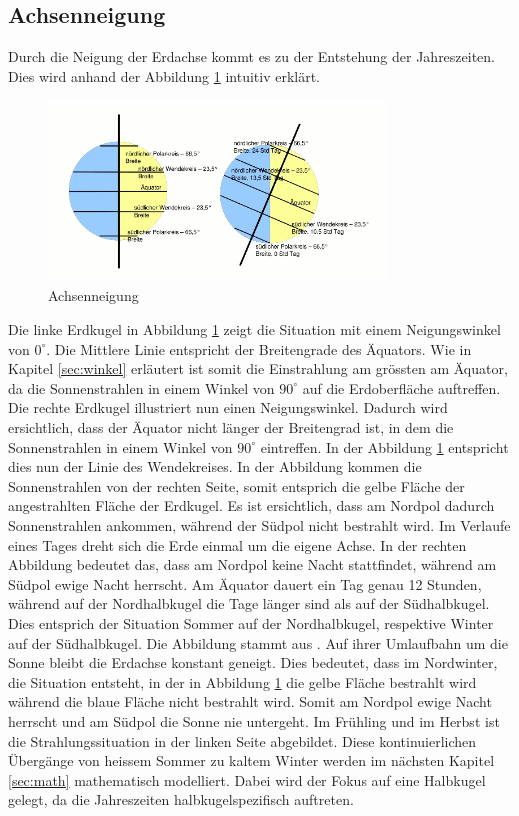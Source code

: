 \begin{refsection}
\section{Achsenneigung}\label{sec:neigung} 
Durch die Neigung der Erdachse kommt es zu der Entstehung der Jahreszeiten. Dies wird anhand der Abbildung \ref{fig:abb6} intuitiv erklärt. 
%
\begin{figure}
	\centering
	\includegraphics[width= 0.8\textwidth]{neigung/tagundnacht.png}
	\caption[Achsenneigung]{Achsenneigung}
	\label{fig:abb6}
\end{figure}
%
Die linke Erdkugel in Abbildung \ref{fig:abb6} zeigt die Situation mit einem Neigungswinkel von $0^\circ$. Die Mittlere Linie entspricht der Breitengrade des Äquators. Wie in Kapitel \ref{sec:winkel} erläutert ist somit die Einstrahlung am grössten am Äquator, da die Sonnenstrahlen in einem Winkel von $90^\circ$ auf die Erdoberfläche auftreffen. Die rechte Erdkugel illustriert nun einen Neigungswinkel. Dadurch wird ersichtlich, dass der Äquator nicht länger der Breitengrad ist, in dem die Sonnenstrahlen in einem Winkel von $90^\circ$ eintreffen. In der Abbildung \ref{fig:abb6} entspricht dies nun der Linie des Wendekreises. In der Abbildung kommen die Sonnenstrahlen von der rechten Seite, somit entsprich die gelbe Fläche der angestrahlten Fläche der Erdkugel. Es ist ersichtlich, dass am Nordpol dadurch Sonnenstrahlen ankommen, während der Südpol nicht bestrahlt wird. Im Verlaufe eines Tages dreht sich die Erde einmal um die eigene Achse. In der rechten Abbildung bedeutet das, dass am Nordpol keine Nacht stattfindet, während am Südpol ewige Nacht herrscht. Am Äquator dauert ein Tag genau 12 Stunden, während auf der Nordhalbkugel die Tage länger sind als auf der Südhalbkugel. Dies entsprich der Situation Sommer auf der Nordhalbkugel, respektive Winter auf der Südhalbkugel. Die Abbildung stammt aus \cite{fa}.
Auf ihrer Umlaufbahn um die Sonne bleibt die Erdachse konstant geneigt. Dies bedeutet, dass im Nordwinter, die Situation entsteht, in der in Abbildung \ref{fig:abb6} die gelbe Fläche bestrahlt wird während die blaue Fläche nicht bestrahlt wird. Somit am Nordpol ewige Nacht herrscht und am Südpol die Sonne nie untergeht. Im Frühling und im Herbst ist die Strahlungssituation in der linken Seite abgebildet. Diese kontinuierlichen Übergänge von heissem Sommer zu kaltem Winter werden im nächsten Kapitel \ref{sec:math} mathematisch modelliert. Dabei wird der Fokus auf eine Halbkugel gelegt, da die Jahreszeiten halbkugelspezifisch auftreten. 


\end{refsection}
